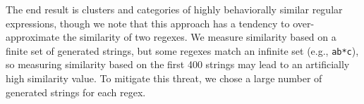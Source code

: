 The end result is clusters and categories of highly behaviorally similar regular expressions, though we note that this approach has a tendency to over-approximate the similarity of two regexes. We measure similarity based on a finite set of generated strings, but some regexes  match an infinite set (e.g., \verb!ab*c!), so measuring similarity based on the first 400 strings may lead to an artificially high similarity value. To mitigate this threat, we chose a large number of generated strings for each regex.


%
%

